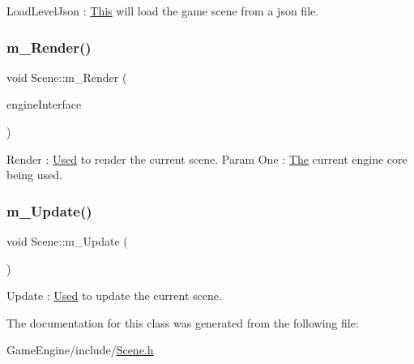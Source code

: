 Load\+Level\+Json \+: \mbox{\hyperlink{class_this}{This}} will load the game scene from a json file. \mbox{\label{class_scene_a09f503e90af9f19de0f461b827425ccb}} 
\subsubsection{\texorpdfstring{m\+\_\+\+Render()}{m\_Render()}}
{\footnotesize\ttfamily void Scene\+::m\+\_\+\+Render (\begin{DoxyParamCaption}\item[{\mbox{\hyperlink{class_i_engine_core}{I\+Engine\+Core}} $\ast$}]{engine\+Interface }\end{DoxyParamCaption})}

Render \+: \mbox{\hyperlink{class_used}{Used}} to render the current scene. Param One \+: \mbox{\hyperlink{class_the}{The}} current engine core being used. \mbox{\label{class_scene_a2d84a7dbabaf8b0dd135d754200cb126}} 
\subsubsection{\texorpdfstring{m\+\_\+\+Update()}{m\_Update()}}
{\footnotesize\ttfamily void Scene\+::m\+\_\+\+Update (\begin{DoxyParamCaption}{ }\end{DoxyParamCaption})}

Update \+: \mbox{\hyperlink{class_used}{Used}} to update the current scene. 

The documentation for this class was generated from the following file\+:\begin{DoxyCompactItemize}
\item 
Game\+Engine/include/\mbox{\hyperlink{_scene_8h}{Scene.\+h}}\end{DoxyCompactItemize}
